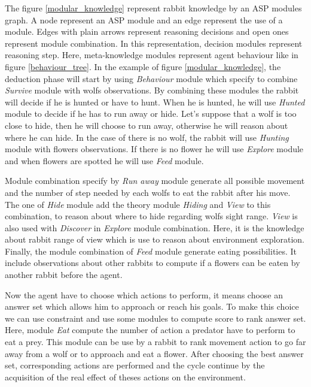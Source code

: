 \documentclass{aamas2012}
\begin{document}
	The figure \ref{modular_knowledge} represent rabbit knowledge by an ASP modules graph.
	A node represent an ASP module and an edge represent the use of a module.
	Edges with plain arrows represent reasoning decisions and open ones represent module combination.
	In this representation, decision modules represent reasoning step.
	Here, meta-knowledge modules represent agent behaviour like in figure \ref{behaviour_tree}.
	In the example of figure \ref{modular_knowledge}, 
	the deduction phase will start by using \textit{Behaviour} module which specify to combine \textit{Survive} module with wolfs observations.
	By combining these modules the rabbit will decide if he is hunted or have to hunt.
	When he is hunted, he will use \textit{Hunted} module to decide if he has to run away or hide.
	Let's suppose that a wolf is too close to hide, then he will choose to run away, otherwise he will reason about where he can hide.
	In the case of there is no wolf, the rabbit will use \textit{Hunting} module with flowers observations.
	If there is no flower he will use \textit{Explore} module and when flowers are spotted he will use \textit{Feed} module.
	
	Module combination specify by \textit{Run away} module generate all possible movement and the number of step needed by each wolfs to eat the rabbit after his move.
	The one of \textit{Hide} module add the theory module \textit{Hiding} and \textit{View} to this combination, to reason about where to hide regarding wolfs sight range. 
	\textit{View} is also used with \textit{Discover} in \textit{Explore} module combination.
	Here, it is the knowledge about rabbit range of view which is use to reason about environment exploration.
	Finally, the module combination of \textit{Feed} module generate eating possibilities.
	It include observations about other rabbits to compute if a flowers can be eaten by another rabbit before the agent.
	
	Now the agent have to choose which actions to perform, it means choose an answer set which allows him to approach or reach his goals.
	To make this choice we can use constraint and use some modules to compute score to rank answer set.
	Here, module \textit{Eat} compute the number of action a predator have to perform to eat a prey.
	This module can be use by a rabbit to rank movement action to go far away from a wolf or to approach and eat a flower.
	After choosing the best answer set, corresponding actions are performed and 
	the cycle continue by the acquisition of the real effect of theses actions on the environment.
\end{document}
